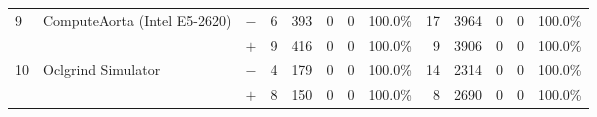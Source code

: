 \begin{tabular}{lll | rrrrr | rrrrr }
\hline
\multirow{ 2}{*}{9} & \multirow{ 2}{*}{ComputeAorta (Intel E5-2620)} & $-$ & 6 & 393 & 0 & 0 & 100.0\%       & 17 & 3964 & 0 & 0 & 100.0\% \\& & $+$ & 9 & 416 & 0 & 0 & 100.0\% & 9 & 3906 & 0 & 0 & 100.0\% \\
\hline
\multirow{ 2}{*}{10} & \multirow{ 2}{*}{Oclgrind Simulator} & $-$ & 4 & 179 & 0 & 0 & 100.0\%       & 14 & 2314 & 0 & 0 & 100.0\% \\& & $+$ & 8 & 150 & 0 & 0 & 100.0\% & 8 & 2690 & 0 & 0 & 100.0\% \\
  \bottomrule
\end{tabular}

